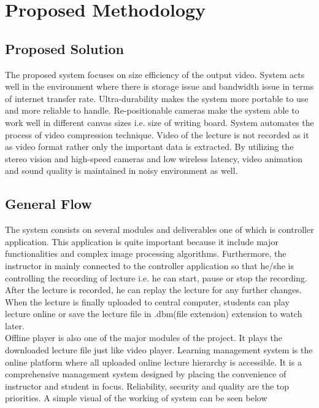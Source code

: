 
\chapter{Proposed Methodology} %
\label{Chapter3}

\section{Proposed Solution}
The proposed system focuses on size efficiency of the output video. System acts well in the environment where there is storage issue and bandwidth issue in terms of internet transfer rate. Ultra-durability makes the system more portable to use and more reliable to handle. Re-positionable cameras make the system able to work well in different canvas sizes i.e. size of writing board. System automates the process of video compression technique. Video of the lecture is not recorded as it as video format rather only the important data is extracted. By utilizing the stereo vision and high-speed cameras and low wireless latency, video animation and sound quality is maintained in noisy environment as well. 


\section{General Flow}
The system consists on several modules and deliverables one of which is controller application. This application is quite important because it include major functionalities and complex image processing algorithms. Furthermore, the instructor in mainly connected to the controller application so that he/she is controlling the recording of lecture i.e. he can start, pause or stop the recording. After the lecture is recorded, he can replay the lecture for any further changes. When the lecture is finally uploaded to central computer, students can play lecture online or save the lecture file in .dbm(file extension) extension to watch later.\\ Offline player is also one of the major modules of the project. It plays the downloaded lecture file just like video player. Learning management system is the online platform where all uploaded online lecture hierarchy is accessible. It is a comprehensive management system designed by placing the convenience of instructor and student in focus. Reliability, security and quality are the top priorities.
A simple visual of the working of system can be seen below

